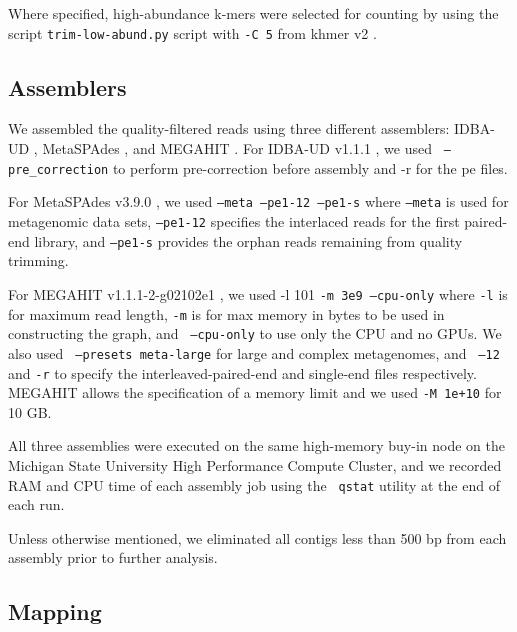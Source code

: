 \documentclass[11pt]{article}
\begin{document}

Where specified, high-abundance k-mers were selected for counting by
using the script {\tt trim-low-abund.py} script with {\tt -C 5} from
khmer v2 \cite{streaming, khmer2}.


\subsection*{Assemblers}

We assembled the quality-filtered reads using three different
assemblers: IDBA-UD \cite{idba}, MetaSPAdes \cite{metaspades}, and MEGAHIT
\cite{megahit}.  For IDBA-UD v1.1.1 \cite{idba}, we used {\tt
  {--pre\_correction}} to perform pre-correction before assembly and
-r for the pe files.


For MetaSPAdes v3.9.0 \cite{metaspades}, we used { \tt {--meta --pe1-12
    --pe1-s}} where {\tt{--meta}} is used for
metagenomic data sets, {\tt{--pe1-12}} specifies the interlaced reads
for the first paired-end library, and {\tt{--pe1-s}} provides the
orphan reads remaining from quality trimming.


For MEGAHIT v1.1.1-2-g02102e1 \cite{megahit}, we used -l 101 {\tt{-m 3e9
    --cpu-only}} where {\tt -l} is for maximum read length, {\tt -m} is
for max memory in bytes to be used in constructing the graph, and {\tt
  {--cpu-only}} to use only the CPU and no GPUs. We also used {\tt
  {--presets meta-large}} for large and complex metagenomes, and {\tt
  {--12} } and {\tt{-r}} to specify the
interleaved-paired-end and single-end files respectively.  MEGAHIT allows
the specification of a memory limit and we used {\tt -M 1e+10} for 10 GB.


All three assemblies were executed on the same high-memory buy-in node
on the Michigan State University High Performance Compute Cluster, and
we recorded RAM and CPU time of each assembly job using the {\tt
  qstat} utility at the end of each run.

Unless otherwise mentioned, we eliminated all contigs less than 500 bp
from each assembly prior to further analysis.

\subsection*{Mapping}
\end{document}
